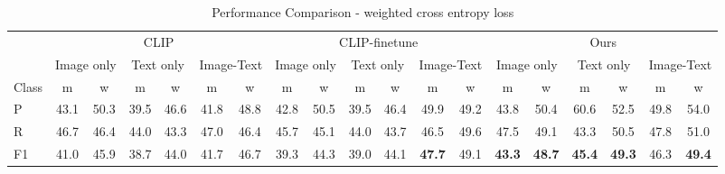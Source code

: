 \begin{table*}
    \centering
    \caption{Performance Comparison - weighted cross entropy loss}
    \label{tab: baselines3}

    \begin{tabular}{l|cc|cc|cc|cc|cc|cc|cc|cc|cc }
    \hline

             & \multicolumn{6}{c|}{CLIP} 
             & \multicolumn{6}{c|}{CLIP-finetune} 
             & \multicolumn{6}{c}{Ours} \\ 
        \cline{2-19}
            & \multicolumn{2}{c}{Image only} 
             & \multicolumn{2}{c}{Text only} 
             & \multicolumn{2}{c|}{Image-Text} 
             & \multicolumn{2}{c}{Image only} 
             & \multicolumn{2}{c}{Text only} 
             & \multicolumn{2}{c|}{Image-Text}
             & \multicolumn{2}{c}{Image only} 
             & \multicolumn{2}{c}{Text only} 
             & \multicolumn{2}{c}{Image-Text} \\
             \cline{2-19}
        Class & m&w& m&w& m&w& m&w& m&w& m&w& m&w& m&w& m&w   \\ 
        \hline
        P & 43.1 & 50.3 & 39.5 & 46.6 & 41.8 & 48.8 & 42.8 & 50.5 & 39.5 & 46.4 & 49.9 & 49.2 & 43.8 & 50.4 & 60.6 & 52.5 &  49.8 & 54.0\\
        R & 46.7 & 46.4 & 44.0 & 43.3 & 47.0 & 46.4 & 45.7 & 45.1 & 44.0 & 43.7 & 46.5 & 49.6 & 47.5 & 49.1 & 43.3 & 50.5 & 47.8  & 51.0\\
        F1 & 41.0 & 45.9 & 38.7 & 44.0 & 41.7 & 46.7 & 39.3 & 44.3 & 39.0 & 44.1 & \textbf{47.7} & 49.1 & \textbf{43.3} & \textbf{48.7} & \textbf{45.4} & \textbf{49.3} &  46.3 & \textbf{49.4}\\
        \hline
        
    \end{tabular}    
\end{table*}



